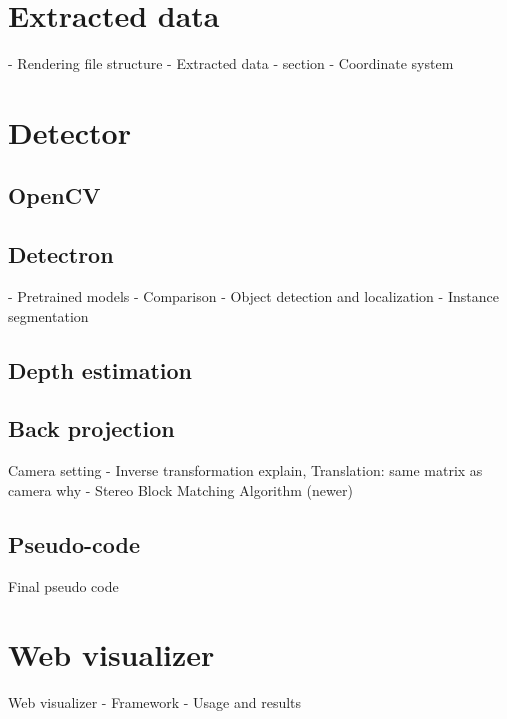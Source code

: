 \section{Extracted data}
- Rendering file structure 
- Extracted data - section
- Coordinate system
\section{Detector}
    \subsection{OpenCV}
    \subsection{Detectron}
    - Pretrained models
    - Comparison
    - Object detection and localization
    - Instance segmentation
    \subsection{Depth estimation}
    \subsection{Back projection}
        Camera setting
    - Inverse transformation explain, Translation: same matrix as camera why
    - Stereo Block Matching Algorithm (newer)
    \subsection{Pseudo-code}
        Final pseudo code
\section{Web visualizer}
        Web visualizer
    -  Framework
    -  Usage and results